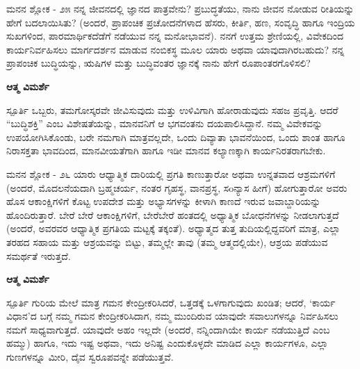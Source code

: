 \newpage
\begin{mananam}{\mananamfont ಮನನ ಶ್ಲೋಕ - ೨೫}
\mananamtext ನನ್ನ ಜೀವನದಲ್ಲಿ ಜ್ಞಾನದ ಪಾತ್ರವೇನು? ಪ್ರಬುದ್ಧತೆಯು, ನಾನು ಜೀವನ ನೋಡುವ ರೀತಿಯನ್ನು ಹೇಗೆ ಬದಲಾಯಿಸಿತು? (ಅಂದರೆ, ಪ್ರಾಪಂಚಿಕ ಪ್ರಚೋದನೆಗಳಾದ ಹೆಸರು, ಕೀರ್ತಿ, ಹಣ, ಸಂವೃದ್ಧಿ ಹಾಗೂ ಇಂದ್ರಿಯ ಸುಖಗಳಿಂದ, ಪಾರಮಾರ್ಥಿಕದೆಡೆಗೆ ನಡೆಯುವ ನನ್ನ ಮನೋಭಾವನೆ). ನನಗೆ ಉತ್ತಮ ಶ್ರೇಣಿಯಲ್ಲಿ, ವಿವೇಕದಿಂದ ಕಾರ್ಯನಿರ್ವಹಿಸಲು ಮಾರ್ಗದರ್ಶನ ಮಾಡುವ ನಂಬಿಕಸ್ಥ ಮೂಲ ಯಾರು ಅಥವಾ ಯಾವುದಾಗಿರಬಹುದು? ನನ್ನ ಪ್ರಾಪಂಚಿಕ ಬುದ್ಧಿಯನ್ನು, ಋಷಿಗಳ ಮತ್ತು ಬುದ್ಧಿವಂತರ ಜ್ಞಾನಕ್ಕೆ ನಾನು ಹೇಗೆ ರೂಪಾಂತರಗೊಳಿಸಲಿ? 
\end{mananam}
\WritingHand\enspace\textbf{ಆತ್ಮ ವಿಮರ್ಶೆ}\\
\begin{inspiration}{\mananamfont ಸ್ಪೂರ್ತಿ}
\mananamtext ಒಬ್ಬರು, ತಮಗೋಸ್ಕರವೇ ಜೀವಿಸುವುದು ಮತ್ತು ಉಳಿವಿಗಾಗಿ ಹೋರಾಡುವುದು ಸಹಜ ಪ್ರವೃತ್ತಿ. ಆದರೆ “ಬುದ್ಧಿಶಕ್ತಿ” ಎಂಬ ವಿಶೇಷತೆಯನ್ನು, ಮಾನವನಿಗೆ ಆ ಭಗವಂತನು ದಯಪಾಲಿಸಿದ್ದಾನೆ. ನಮ್ಮ ವಿವೇಕವನ್ನು ಉಪಯೋಗಿಸಿಕೊಂಡು, ಬರೇ ನಮಗಾಗಿ ಮಾತ್ರವಲ್ಲದೇ, ಒಂದು ದಿವ್ಯಾತಾ ಭಾವನೆಯಿಂದ, ಒಂದು ಶಾಂತ ಹಾಗೂ ನಿರಾಸಕ್ತತಾ ಭಾವದಿಂದ, ಮಾನವೀಯತೆಗಾಗಿ ಹಾಗೂ ಇಡೀ ಮಾನವ ಕಲ್ಯಾಣಕ್ಕಾಗಿ ಕಾರ್ಯನಿರತರಾಗಬೇಕು. 
\end{inspiration}
\newpage

\begin{mananam}{\mananamfont ಮನನ ಶ್ಲೋಕ - ೨೬}
\mananamtext ಯಾರು ಆಧ್ಯಾತ್ಮಿಕ ದಾರಿಯಲ್ಲಿ ಪ್ರಗತಿ ಕಾಣುತ್ತಾರೋ ಅಥವಾ ಉನ್ನತವಾದ ಆಶ್ರಮಗಳಿಗೆ (ಅಂದರೆ, ಮೊದಲನೆಯದಾಗಿ ಬ್ರಹ್ಮಚರ್ಯ, ನಂತರ ಗೃಹಸ್ಥ, ವಾನಪ್ರಸ್ಥ, ಸoನ್ಯಾಸ ಹೀಗೆ) ಹೋಗುತ್ತಾರೋ ಅವರು ಹೊಸ ಆಕಾಂಕ್ಷಿಗಳಿಗೆ ಕೊಟ್ಟ ಉಪದೇಶ ಮತ್ತು ಅಭ್ಯಾಸಗಳನ್ನು ಕೀಳಾಗಿ ಕಾಣದೆ ಇರುವ ಜವಾಬ್ದಾರಿಯನ್ನು ಹೊಂದಿರುತ್ತಾರೆ. ಬೇರೆ ಬೇರೆ ಆಕಾಂಕ್ಷಿಗಳಿಗೆ, ಬೇರೆಬೇರೆ ಹಂತದಲ್ಲಿ ಅಧ್ಯಾತ್ಮಿಕ ಬೋಧನೆಗಳನ್ನು ನೀಡಲಾಗುತ್ತದೆ (ಅಂದರೆ, ಅವರವರ ಆಧ್ಯಾತ್ಮಿಕ ಪ್ರಗತಿಯ ಮಟ್ಟಕ್ಕೆ ತಕ್ಕಂತೆ). ಅಧ್ಯಾತ್ಮದ ತುತ್ತ ತುದಿಯಲ್ಲಿದ್ದವರಿಗೆ ಮಾತ್ರ, ಎಲ್ಲಾ ತರಹದ ಸಹಾಯ ಮತ್ತು ಆಶ್ರಯವನ್ನು ಬಿಟ್ಟು, ತಮ್ಮಲ್ಲೇ ತಾವು (ತಮ್ಮ ಆತ್ಮದಲ್ಲಿಯೇ), ಆಶ್ರಯ ಪಡೆಯುವ ಸಮರ್ಥತೆ ಇರುತ್ತದೆ.
\end{mananam}
\WritingHand\enspace\textbf{ಆತ್ಮ ವಿಮರ್ಶೆ}\\
\begin{inspiration}{\mananamfont ಸ್ಪೂರ್ತಿ}
\mananamtext ಗುರಿಯ ಮೇಲೆ ಮಾತ್ರ ಗಮನ ಕೇಂದ್ರೀಕರಿಸಿದರೆ, ಒತ್ತಡಕ್ಕೆ ಒಳಗಾಗುವುದು ಖಂಡಿತ; ಆದರೆ, ‘ಕಾರ್ಯ ವಿಧಾನ’ದ ಬಗ್ಗೆ ನಮ್ಮ ಗಮನ ಕೇಂದ್ರೀಕರಿಸಿದಾಗ, ನಮ್ಮ ಮುಂದಿರುವ ಯಾವುದೇ ಸವಾಲುಗಳನ್ನೂ ನಿರ್ವಹಿಸಲು ನಮಗೆ ಸಾಧ್ಯವಾಗುತ್ತದೆ. ಯಾವುದೇ ಅಹಂ ಇಲ್ಲದೇ (ಅಂದರೆ, ನನ್ನಿಂದಾಗಿಯೇ ಕಾರ್ಯ ನಡೆಯುತ್ತಿದೆ ಎಂಬ ಹಮ್ಮು) ಹಾಗೂ, ಇದು ಇಷ್ಟ ಅಥವಾ, ಇದು ಅನಿಷ್ಟ ಎಂದುಕೊಳ್ಳದೇ ಮಾಡಿದ ಎಲ್ಲಾ ಕಾರ್ಯಗಳೂ, ಎಲ್ಲಾ ಗುಣಗಳನ್ನೂ ಮೀರಿ, ದೈವ ಸ್ವರೂಪವನ್ನೇ ಪಡೆಯುತ್ತವೆ.
\end{inspiration}
\newpage

